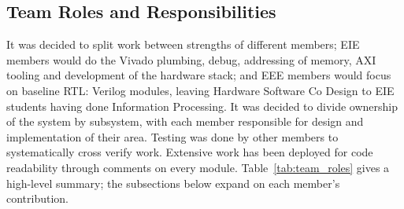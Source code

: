 \subsection{Team Roles and Responsibilities}
It was decided to split work between strengths of different members; EIE members would do the Vivado plumbing, debug, addressing of memory, AXI tooling and development of the hardware stack; and EEE members would focus on baseline RTL: Verilog modules, leaving Hardware Software Co Design to EIE students having done Information Processing.
It was decided to divide ownership of the system by subsystem, with each member
responsible for design and implementation of their area. Testing was done by other members to systematically cross verify work.
Extensive work has been deployed for code readability through comments on every module.
Table~\ref{tab:team_roles} gives a high-level summary; the subsections below
expand on each member's contribution.

